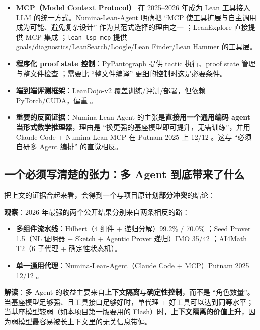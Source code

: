 \documentclass[UTF8,a4paper,11pt,fontset=windows]{ctexart}
\newcommand{\code}[1]{\texttt{#1}}
\begin{document}
\begin{itemize}
  \item \textbf{MCP（Model Context Protocol）} 在 2025--2026 年成为 Lean 工具接入 LLM 的统一方式。Numina-Lean-Agent 明确把 ``MCP 使工具扩展与自主调用成为可能、避免复杂设计'' 作为其范式选择的理由之一 \cite{numina}；LeanExplore 直接提供 MCP 集成 \cite{leanexplore}；\code{lean-lsp-mcp} 提供 goals/diagnostics/LeanSearch/Loogle/Lean Finder/Lean Hammer 的工具层。
  \item \textbf{程序化 proof state 控制}：PyPantograph 提供 tactic 执行、proof state 管理与整文件检查 \cite{pantograph}；需要比 ``整文件编译'' 更细的控制时这是必要条件。
  \item \textbf{端到端评测框架}：LeanDojo-v2 覆盖训练/评测/部署，但依赖 PyTorch/CUDA，偏重 \cite{leandojo}。
  \item \textbf{重要的反面证据}：Numina-Lean-Agent 的主张是\textbf{直接用一个通用编码 agent 当形式数学推理器}，理由是 ``换更强的基座模型即可提升，无需训练''，并用 Claude Code + Numina-Lean-MCP 在 Putnam 2025 上 12/12 \cite{numina}。这与 ``必须自研多 Agent 编排'' 的直觉相反。
\end{itemize}

\subsection{一个必须写清楚的张力：多 Agent 到底带来了什么}

把上文的证据合起来看，会得到一个与项目原计划\textbf{部分冲突}的结论：

\begin{tcolorbox}[colback=white,colframe=warnred,boxrule=0.6pt,arc=2pt,left=8pt,right=8pt,top=6pt,bottom=6pt]
\small
\textbf{观察}：2026 年最强的两个公开结果分别来自两条相反的路：
\begin{itemize}
  \item \textbf{多组件流水线}：Hilbert（4 组件 + 递归分解）99.2\% / 70.0\% \cite{hilbert}；Seed Prover 1.5（NL 证明器 + Sketch + Agentic Prover 递归）IMO 35/42 \cite{seedprover}；AI4Math T2（6 子代理 + 确定性状态机）\cite{ai4math}。
  \item \textbf{单一通用代理}：Numina-Lean-Agent（Claude Code + MCP）Putnam 2025 12/12 \cite{numina}。
\end{itemize}
\textbf{解读}：多 Agent 的收益主要来自\textbf{上下文隔离}与\textbf{确定性控制}，而不是 ``角色数量''。当基座模型足够强、且工具接口足够好时，单代理 + 好工具可以达到同等水平；当基座模型较弱（如本项目第一版要用的 Flash）时，\textbf{上下文隔离的价值上升}，因为弱模型最容易被长上下文里的无关信息带偏。
\end{tcolorbox}
\end{document}
